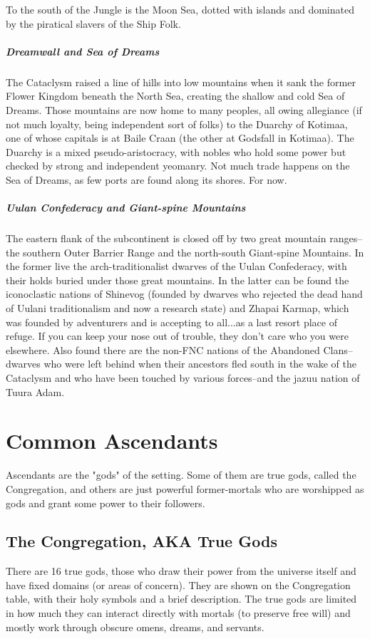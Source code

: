To the south of the Jungle is the Moon Sea, dotted with islands and dominated by the piratical slavers of the Ship Folk.

\subparagraph*{Dreamwall and Sea of Dreams} The Cataclysm raised a line of hills into low mountains when it sank the former Flower Kingdom beneath the North Sea, creating the shallow and cold Sea of Dreams. Those mountains are now home to many peoples, all owing allegiance (if not much loyalty, being independent sort of folks) to the Duarchy of Kotimaa, one of whose capitals is at Baile Craan (the other at Godsfall in Kotimaa). The Duarchy is a mixed pseudo-aristocracy, with nobles who hold some power but checked by strong and independent yeomanry. Not much trade happens on the Sea of Dreams, as few ports are found along its shores. For now.

\subparagraph*{Uulan Confederacy and Giant-spine Mountains}
The eastern flank of the subcontinent is closed off by two great mountain ranges--the southern Outer Barrier Range and the north-south Giant-spine Mountains. In the former live the arch-traditionalist dwarves of the Uulan Confederacy, with their holds buried under those great mountains. In the latter can be found the iconoclastic nations of Shinevog (founded by dwarves who rejected the dead hand of Uulani traditionalism and now a research state) and Zhapai Karmap, which was founded by adventurers and is accepting to all...as a last resort place of refuge. If you can keep your nose out of trouble, they don't care who you were elsewhere. Also found there are the non-FNC nations of the Abandoned Clans--dwarves who were left behind when their ancestors fled south in the wake of the Cataclysm and who have been touched by various forces--and the jazuu nation of Tuura Adam.

\section{Common Ascendants}
Ascendants are the "gods" of the setting. Some of them are true gods, called the Congregation, and others are just powerful former-mortals who are worshipped as gods and grant some power to their followers.

\subsection{The Congregation, AKA True Gods}
There are 16 true gods, those who draw their power from the universe itself and have fixed domains (or areas of concern). They are shown on the Congregation table, with their holy symbols and a brief description. The true gods are limited in how much they can interact directly with mortals (to preserve free will) and mostly work through obscure omens, dreams, and servants.

